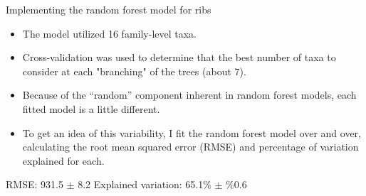 \documentclass{beamer}
\begin{document}
\begin{frame}{Implementing the random forest model for ribs}

  \begin{itemize}
  \item The model utilized 16 family-level taxa.
  \item Cross-validation was used to determine that the best number of
    taxa to consider at each "branching" of the trees (about 7).
  \end{itemize}

  \vspace{0.1in}

  \begin{itemize}
  \item Because of the ``random'' component inherent in random forest
    models, each fitted model is a little different.
  \item To get an idea of this variability, I fit the random forest
    model over and over, calculating the root mean squared error
    (RMSE) and percentage of variation explained for each.
  \end{itemize}

  \vspace{0.1in}
  
  \noindent RMSE: 931.5 $\pm$ 8.2 \hspace{0.2in}  Explained variation: 65.1\% $\pm$ \%0.6

\end{frame}
\end{document}
